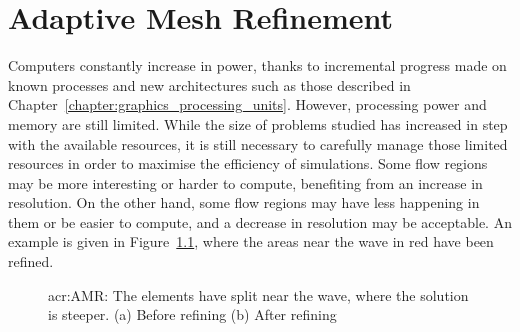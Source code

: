 \chapter{Adaptive Mesh Refinement}\label{chapter:adaptive_mesh_refinement}

Computers constantly increase in power, thanks to incremental progress made on known processes and
new architectures such as those described in Chapter~\ref{chapter:graphics_processing_units}.
However, processing power and memory are still limited. While the size of problems studied has
increased in step with the available resources, it is still necessary to carefully manage those
limited resources in order to maximise the efficiency of simulations. Some flow regions may be more
interesting or harder to compute, benefiting from an increase in resolution. On the other hand, some
flow regions may have less happening in them or be easier to compute, and a decrease in resolution
may be acceptable. An example is given in Figure~\ref{fig:mesh_refinement}, where the areas near the
wave in red have been refined.

\begin{figure}[H]
    \centering
    \hfill
    \caption{\Acrlong{acr:AMR}: The elements have split near the wave, where the solution is steeper. (a) Before refining (b) After refining}\label{fig:mesh_refinement}
\end{figure}

